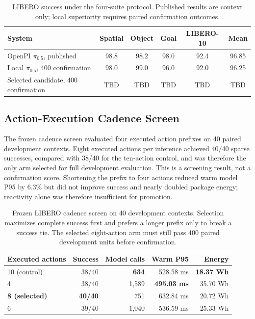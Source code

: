 \documentclass[11pt]{article}
\begin{document}
\begin{table}[t]
\centering
\caption{LIBERO success under the four-suite protocol. Published results are
context only; local superiority requires paired confirmation outcomes.}
\label{tab:libero}
\begin{tabular}{@{}lccccc@{}}
\toprule
System & Spatial & Object & Goal & LIBERO-10 & Mean \\
\midrule
OpenPI $\pi_{0.5}$, published & 98.8 & 98.2 & 98.0 & 92.4 & 96.85 \\
Local $\pi_{0.5}$, 400 confirmation & 98.0 & 99.0 & 96.0 & 92.0 & 96.25 \\
Selected candidate, 400 confirmation & TBD & TBD & TBD & TBD & TBD \\
\bottomrule
\end{tabular}
\end{table}

\subsection{Action-Execution Cadence Screen}

The frozen cadence screen evaluated four executed action prefixes on 40 paired
development contexts. Eight executed actions per inference achieved 40/40 sparse
successes, compared with 38/40 for the ten-action control, and was therefore the
only arm selected for full development evaluation. This is a screening result,
not a confirmation score. Shortening the prefix to four actions reduced warm
model P95 by 6.3\% but did not improve success and nearly doubled package energy;
reactivity alone was therefore insufficient for promotion.

\begin{table}[t]
\centering
\caption{Frozen LIBERO cadence screen on 40 development contexts. Selection
maximizes complete success first and prefers a longer prefix only to break a
success tie. The selected eight-action arm must still pass 400 paired development
units before confirmation.}
\label{tab:action-steps}
\begin{tabular}{@{}lrrrr@{}}
\toprule
Executed actions & Success & Model calls & Warm P95 & Energy \\
\midrule
10 (control) & 38/40 & \textbf{634} & 528.58 ms & \textbf{18.37 Wh} \\
4 & 38/40 & 1,589 & \textbf{495.03 ms} & 35.70 Wh \\
\textbf{8 (selected)} & \textbf{40/40} & 751 & 632.84 ms & 20.72 Wh \\
6 & 39/40 & 1,040 & 536.59 ms & 25.33 Wh \\
\bottomrule
\end{tabular}
\end{table}
\end{document}

